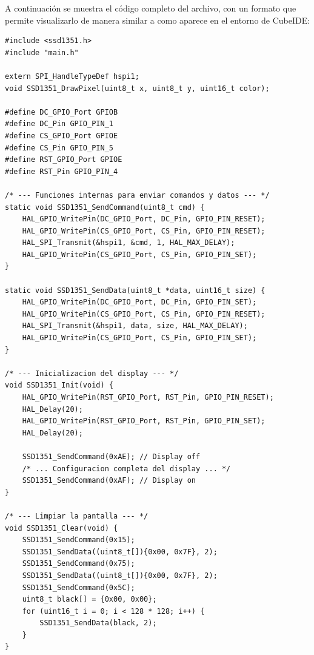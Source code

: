 \documentclass[a4paper,12pt]{article}
\begin{document}
A continuación se muestra el código completo del archivo, con un formato que permite visualizarlo de manera similar a como aparece en el entorno de CubeIDE:


\begin{lstlisting}[caption={Implementación de la librería SSD1351 en el archivo \texttt{ssd1351.c}}, label={lst:ssd1351}]
#include <ssd1351.h>
#include "main.h"

extern SPI_HandleTypeDef hspi1;
void SSD1351_DrawPixel(uint8_t x, uint8_t y, uint16_t color);

#define DC_GPIO_Port GPIOB
#define DC_Pin GPIO_PIN_1
#define CS_GPIO_Port GPIOE
#define CS_Pin GPIO_PIN_5
#define RST_GPIO_Port GPIOE
#define RST_Pin GPIO_PIN_4

/* --- Funciones internas para enviar comandos y datos --- */
static void SSD1351_SendCommand(uint8_t cmd) {
    HAL_GPIO_WritePin(DC_GPIO_Port, DC_Pin, GPIO_PIN_RESET);
    HAL_GPIO_WritePin(CS_GPIO_Port, CS_Pin, GPIO_PIN_RESET);
    HAL_SPI_Transmit(&hspi1, &cmd, 1, HAL_MAX_DELAY);
    HAL_GPIO_WritePin(CS_GPIO_Port, CS_Pin, GPIO_PIN_SET);
}

static void SSD1351_SendData(uint8_t *data, uint16_t size) {
    HAL_GPIO_WritePin(DC_GPIO_Port, DC_Pin, GPIO_PIN_SET);
    HAL_GPIO_WritePin(CS_GPIO_Port, CS_Pin, GPIO_PIN_RESET);
    HAL_SPI_Transmit(&hspi1, data, size, HAL_MAX_DELAY);
    HAL_GPIO_WritePin(CS_GPIO_Port, CS_Pin, GPIO_PIN_SET);
}

/* --- Inicializacion del display --- */
void SSD1351_Init(void) {
    HAL_GPIO_WritePin(RST_GPIO_Port, RST_Pin, GPIO_PIN_RESET);
    HAL_Delay(20);
    HAL_GPIO_WritePin(RST_GPIO_Port, RST_Pin, GPIO_PIN_SET);
    HAL_Delay(20);

    SSD1351_SendCommand(0xAE); // Display off
    /* ... Configuracion completa del display ... */
    SSD1351_SendCommand(0xAF); // Display on
}

/* --- Limpiar la pantalla --- */
void SSD1351_Clear(void) {
    SSD1351_SendCommand(0x15);
    SSD1351_SendData((uint8_t[]){0x00, 0x7F}, 2);
    SSD1351_SendCommand(0x75);
    SSD1351_SendData((uint8_t[]){0x00, 0x7F}, 2);
    SSD1351_SendCommand(0x5C);
    uint8_t black[] = {0x00, 0x00};
    for (uint16_t i = 0; i < 128 * 128; i++) {
        SSD1351_SendData(black, 2);
    }
}


\end{lstlisting}
\end{document}
